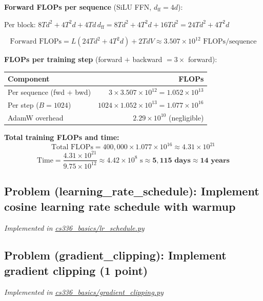 \documentclass[letterpaper]{article}
\begin{document}
\begin{itemize}
	\textbf{Forward FLOPs per sequence} (SiLU FFN, $d_\text{ff} = 4d$):

	Per block: $8Td^2 + 4T^2d + 4Td\,d_\text{ff} = 8Td^2 + 4T^2d + 16Td^2 = 24Td^2 + 4T^2d$

	\[
		\text{Forward FLOPs} = L(24Td^2 + 4T^2d) + 2TdV \approx 3.507\times10^{12} \text{ FLOPs/sequence}
	\]

	\textbf{FLOPs per training step} (forward $+$ backward $= 3\times$ forward):

	\begin{center}
	\begin{tabular}{lr}
	\hline
	\textbf{Component} & \textbf{FLOPs} \\
	\hline
	Per sequence (fwd $+$ bwd) & $3 \times 3.507\times10^{12} = 1.052\times10^{13}$ \\
	Per step ($B = 1024$) & $1024 \times 1.052\times10^{13} = 1.077\times10^{16}$ \\
	AdamW overhead & $2.29\times10^{10}$ (negligible) \\
	\hline
	\end{tabular}
	\end{center}

	\textbf{Total training FLOPs and time:}
	\[
		\text{Total FLOPs} = 400{,}000 \times 1.077\times10^{16} \approx 4.31\times10^{21}
	\]
	\[
		\text{Time} = \frac{4.31\times10^{21}}{9.75\times10^{12}} \approx 4.42\times10^8 \text{ s} \approx \mathbf{5{,}115 \text{ days} \approx 14 \text{ years}}
	\]

\end{itemize}

\subsection{Problem (learning\_rate\_schedule): Implement cosine learning rate schedule with warmup}

\textit{Implemented in  \href{https://github.com/echung32/ece405-assignment1-basics/blob/main/cs336_basics/lr_schedule.py}{cs336\_basics/lr\_schedule.py}}

\subsection{Problem (gradient\_clipping): Implement gradient clipping (1 point)}

\textit{Implemented in  \href{https://github.com/echung32/ece405-assignment1-basics/blob/main/cs336_basics/gradient_clipping.py}{cs336\_basics/gradient\_clipping.py}}
\end{document}
